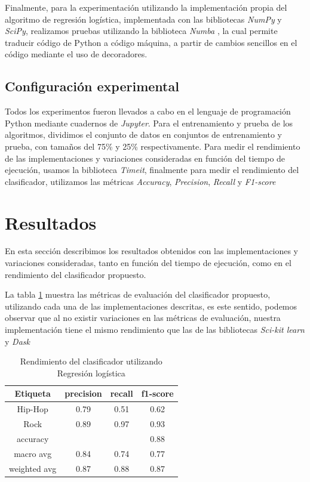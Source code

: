\documentclass[runningheads]{llncs}
\begin{document}
Finalmente, para la experimentación utilizando la implementación propia del algoritmo de regresión logística, implementada con las bibliotecas \textit{NumPy} y \textit{SciPy}, realizamos pruebas utilizando la biblioteca \textit{Numba} \cite{10.1145/2833157.2833162}, la cual permite traducir código de Python a código máquina, a partir de cambios sencillos en el código mediante el uso de decoradores.


\subsection{Configuración experimental}
Todos los experimentos fueron llevados a cabo en el lenguaje de programación Python mediante cuadernos de \textit{Jupyter}. Para el entrenamiento y prueba de los algoritmos, dividimos el conjunto de datos en conjuntos de entrenamiento y prueba, con tamaños del 75\% y 25\% respectivamente. Para medir el rendimiento de las implementaciones y variaciones consideradas en función del tiempo de ejecución, usamos la biblioteca \textit{Timeit}, finalmente para medir el rendimiento del clasificador, utilizamos las métricas \textit{Accuracy}, \textit{Precision}, \textit{Recall} y \textit{F1-score}

\section{Resultados}
En esta sección describimos los resultados obtenidos con las implementaciones y variaciones consideradas, tanto en función del tiempo de ejecución, como en el rendimiento del clasificador propuesto.

La tabla \ref{tab:logRegResults} muestra las métricas de evaluación del clasificador propuesto, utilizando cada una de las implementaciones descritas, es este sentido, podemos observar que al no existir variaciones en las métricas de evaluación, nuestra implementación tiene el mismo rendimiento que las de las bibliotecas \textit{Sci-kit learn} y \textit{Dask}

\begin{table}[h]
    \centering
    \begin{tabular}{|c|c|c|c|}
    \hline
    Etiqueta & precision & recall & f1-score \\
    \hline
    Hip-Hop & 0.79 & 0.51 & 0.62 \\
    Rock & 0.89 & 0.97 & 0.93 \\  
    \hline
    accuracy & & & 0.88 \\
    macro avg & 0.84 & 0.74 & 0.77 \\    
    weighted avg & 0.87 & 0.88 & 0.87\\
    \hline
    \end{tabular}
    \caption{Rendimiento del clasificador utilizando Regresión logística}
    \label{tab:logRegResults}
\end{table}
\end{document}
